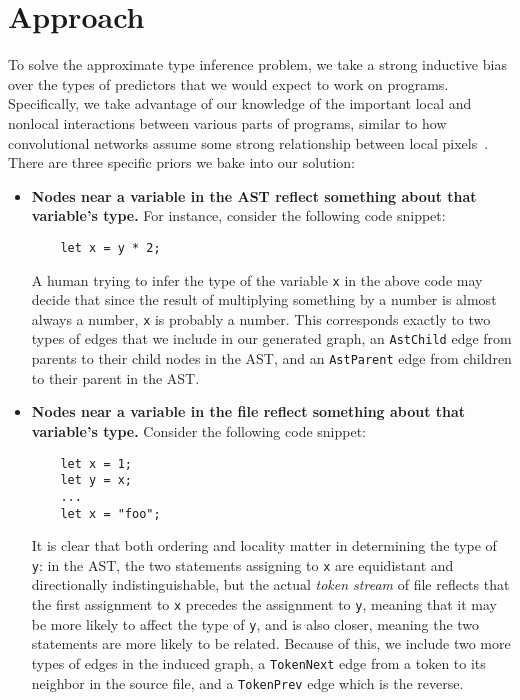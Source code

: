 \section{Approach}
\label{sec:approach}

To solve the approximate type inference problem, we take a strong inductive bias over the types of predictors that we would expect to work on programs.
Specifically, we take advantage of our knowledge of the important local and nonlocal interactions between various parts of programs, similar to how convolutional networks assume some strong relationship between local pixels~\cite{henaff2015deep}.
There are three specific priors we bake into our solution:
\begin{itemize}
\item \textbf{Nodes near a variable in the AST reflect something about that variable's type.}
  For instance, consider the following code snippet:
  \begin{lstlisting}
    let x = y * 2;
  \end{lstlisting}
  A human trying to infer the type of the variable \texttt{x} in the above code may decide that since the result of multiplying something by a number is almost always a number, \texttt{x} is probably a number.
  This corresponds exactly to two types of edges that we include in our generated graph, an \texttt{AstChild} edge from parents to their child nodes in the AST, and an \texttt{AstParent} edge from children to their parent in the AST.

\item \textbf{Nodes near a variable in the file reflect something about that variable's type.}
  Consider the following code snippet:
  \begin{lstlisting}
    let x = 1;
    let y = x;
    ...
    let x = "foo";
  \end{lstlisting}
  It is clear that both ordering and locality matter in determining the type of \texttt{y}: in the AST, the two statements assigning to \texttt{x} are equidistant and directionally indistinguishable, but the actual \emph{token stream} of file reflects that the first assignment to \texttt{x} precedes the assignment to \texttt{y}, meaning that it may be more likely to affect the type of \texttt{y}, and is also closer, meaning the two statements are more likely to be related.
  Because of this, we include two more types of edges in the induced graph, a \texttt{TokenNext} edge from a token to its neighbor in the source file, and a \texttt{TokenPrev} edge which is the reverse.


\end{itemize}
